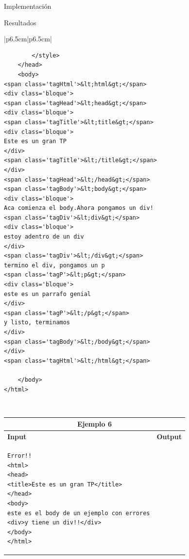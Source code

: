 \documentclass[a4paper,8pt]{article}
\begin{document}
\begin{section}{Implementación}
\begin{subsection}{Resultados}
\begin{tabular}{|p{6.5cm}|p{6.5cm}|}
{\begin{verbatim}
        </style>
    </head>
    <body>
<span class='tagHtml'>&lt;html&gt;</span>
<div class='bloque'>
<span class='tagHead'>&lt;head&gt;</span>
<div class='bloque'>
<span class='tagTitle'>&lt;title&gt;</span>
<div class='bloque'>
Este es un gran TP
</div>
<span class='tagTitle'>&lt;/title&gt;</span>
</div>
<span class='tagHead'>&lt;/head&gt;</span>
<span class='tagBody'>&lt;body&gt;</span>
<div class='bloque'>
Aca comienza el body.Ahora pongamos un div!
<span class='tagDiv'>&lt;div&gt;</span>
<div class='bloque'>
estoy adentro de un div
</div>
<span class='tagDiv'>&lt;/div&gt;</span>
termino el div, pongamos un p
<span class='tagP'>&lt;p&gt;</span>
<div class='bloque'>
este es un parrafo genial
</div>
<span class='tagP'>&lt;/p&gt;</span>
y listo, terminamos
</div>
<span class='tagBody'>&lt;/body&gt;</span>
</div>
<span class='tagHtml'>&lt;/html&gt;</span>

    </body>
</html>\end{verbatim}}\\
\hline

\end{tabular}


\begin{tabular}{|p{6.5cm}|p{6.5cm}|}
\hline 
\multicolumn{2}{|c|}{Ejemplo 6}\\
\hline 
\textbf{Input}&\textbf{Output}\\
\hline 
 \footnotesize{\begin{verbatim}
Error!!
<html>
<head>
<title>Este es un gran TP</title>
</head>
<body>
este es el body de un ejemplo con errores
<div>y tiene un div!!</div>
</body>
</html>                      
\end{verbatim}}
\bigskip


\end{tabular}
\end{subsection}
\end{section}
\end{document}
